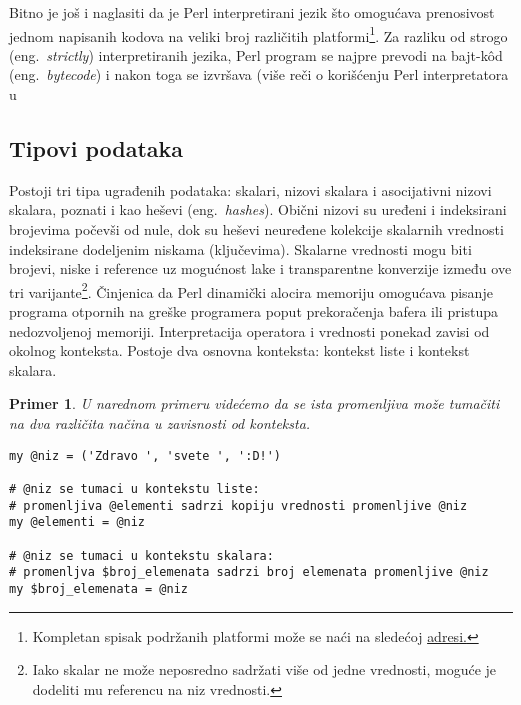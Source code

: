 \documentclass[a4paper]{article}
\newtheorem{primer}{Primer}[section]
\begin{document}
Bitno je još i naglasiti da je Perl interpretirani jezik što omogućava prenosivost jednom napisanih kodova na veliki broj različitih platformi\footnote{Kompletan spisak podržanih platformi može se naći na sledećoj \href{https://perldoc.perl.org/perlport.html#Supported-Platforms}{adresi.}}. Za razliku od strogo (eng.~{\em strictly}) interpretiranih jezika, Perl program se najpre prevodi na bajt-k\^{o}d (eng.~{\em bytecode}) i nakon toga se izvršava (više reči o korišćenju Perl interpretatora u 

\subsection{Tipovi podataka}

Postoji tri tipa ugrađenih podataka: skalari, nizovi skalara i asocijativni nizovi skalara, poznati i kao heševi (eng.~{\em hashes}). Obični nizovi su uređeni i indeksirani brojevima počevši od nule, dok su heševi neuređene kolekcije skalarnih vrednosti indeksirane dodeljenim niskama (ključevima). Skalarne vrednosti mogu biti brojevi, niske i reference uz mogućnost lake i transparentne konverzije između ove tri varijante\footnote{Iako skalar ne može neposredno sadržati više od jedne vrednosti, moguće je dodeliti mu referencu na niz vrednosti.}. Činjenica da Perl dinamički alocira memoriju omogućava pisanje programa otpornih na greške programera poput prekoračenja bafera ili pristupa nedozvoljenoj memoriji. Interpretacija operatora i vrednosti ponekad zavisi od okolnog konteksta. Postoje dva osnovna konteksta: kontekst liste i kontekst skalara.\cite{perldoc}
\begin{primer}
U narednom primeru videćemo da se ista promenljiva može tumačiti na dva različita načina u zavisnosti od konteksta. 
\end{primer}
\begin{lstlisting}[caption={Različiti konteksti}, frame=single, label = kontekst]
my @niz = ('Zdravo ', 'svete ', ':D!')    

# @niz se tumaci u kontekstu liste:
# promenljiva @elementi sadrzi kopiju vrednosti promenljive @niz
my @elementi = @niz        

# @niz se tumaci u kontekstu skalara:
# promenljva $broj_elemenata sadrzi broj elemenata promenljive @niz
my $broj_elemenata = @niz
\end{lstlisting} 
\end{document}
